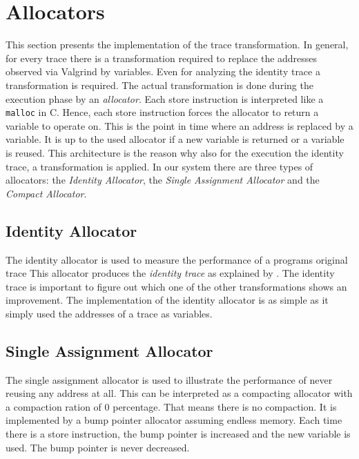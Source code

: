 \documentclass[onecolumn, openright, master, english, signatures]{dbrgrptt}
\begin{document}

\section{Allocators}
\label{sec:allocators}

This section presents the implementation of the trace transformation.
In general, for every trace there is a transformation required to replace the addresses observed via Valgrind by variables.
Even for analyzing the identity \ac{trace} a transformation is required.
The actual transformation is done during the execution phase by an \emph{allocator}.
Each store instruction is interpreted like a \texttt{malloc} in C.
Hence, each store instruction forces the allocator to return a variable to operate on.
This is the point in time where an address is replaced by a variable.
It is up to the used allocator if a new variable is returned or a variable is reused.
This architecture is the reason why also for the execution the identity \ac{trace}, a transformation is applied.
In our system there are three types of allocators: the \emph{Identity Allocator}, the \emph{Single Assignment Allocator} and the \emph{Compact Allocator}.

\subsection{Identity Allocator}\label{ssec:allocator-original}

The identity allocator is used to measure the performance of a programs original \ac{trace}
This allocator produces the \emph{identity \ac{trace}} as explained by .
The identity \ac{trace} is important to figure out which one of the other transformations shows an improvement.
The implementation of the identity allocator is as simple as it simply used the addresses of a \ac{trace} as variables.

\subsection{Single Assignment Allocator}\label{ssec:allocator-single-assignment}

The single assignment allocator is used to illustrate the performance of never reusing any address at all.
This can be interpreted as a compacting allocator with a compaction ration of 0 percentage.
That means there is no compaction.
It is implemented by a bump pointer allocator assuming endless memory.
Each time there is a store instruction, the bump pointer is increased and the new variable is used.
The bump pointer is never decreased.
\end{document}
